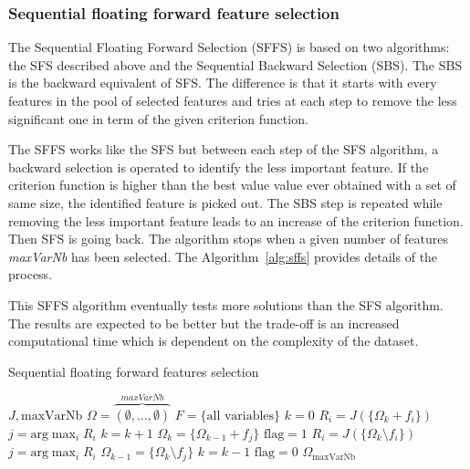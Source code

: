 \documentclass[journal,peerreview,onecolumn]{IEEEtran}
\begin{document}
        \subsubsection{Sequential floating forward feature selection}
        \label{sec:floating-presentation}

        The Sequential Floating Forward Selection (SFFS)\cite{somol1999adaptive} is based on two algorithms: the SFS described above and the Sequential Backward Selection (SBS). The SBS is the backward equivalent of SFS. The difference is that it starts with every features in the pool of selected features and tries at each step to remove the less significant one in term of the given criterion function.

        The SFFS works like the SFS but between each step of the SFS algorithm, a backward selection is operated to identify the less important feature. If the criterion function is higher than the best value value ever obtained with a set of same size, the identified feature is picked out. The SBS step is repeated while removing the less important feature leads to an increase of the criterion function. Then SFS is going back. The algorithm stops when a given number of features \emph{maxVarNb} has been selected. The Algorithm~\ref{alg:sffs} provides details of the process.

        This SFFS algorithm eventually tests more solutions than the SFS algorithm. The results are expected to be better but the trade-off is an increased computational time which is dependent on the complexity of the dataset.

        \begin{algorithm}
        \caption{Sequential floating forward features selection\label{alg:sffs}}
        {\footnotesize
        \begin{algorithmic}[1]
        \REQUIRE $J,\text{maxVarNb}$
        \STATE $\Omega=\overbrace{(\emptyset,...,\emptyset)}^{maxVarNb}$
        \STATE $F=\text{\{all variables\}}$
        \STATE $k=0$
        \STATE $R_i = J(\{\Omega_k + f_i\})$
        \ENDFOR
        \STATE $j=\text{arg} \max_{i} R_i$
        \STATE $k=k+1$
        \STATE $\Omega_k = \{\Omega_{k-1} + f_j\}$
        \STATE $\text{flag}=1$
        \STATE $R_i = J(\{\Omega_k \setminus f_i\})$
        \ENDFOR
        \STATE $j=\text{arg} \max_{i} R_i$
        \STATE $\Omega_{k-1} = \{\Omega_k \setminus f_j\}$
        \STATE $k=k-1$
        \ELSE
        \STATE $\text{flag}=0$
        \ENDIF
        \ENDWHILE
        \ENDIF
        \ENDWHILE
        \RETURN $\Omega_{\text{maxVarNb}}$
        \end{algorithmic}
        }
        \end{algorithm}
\end{document}

